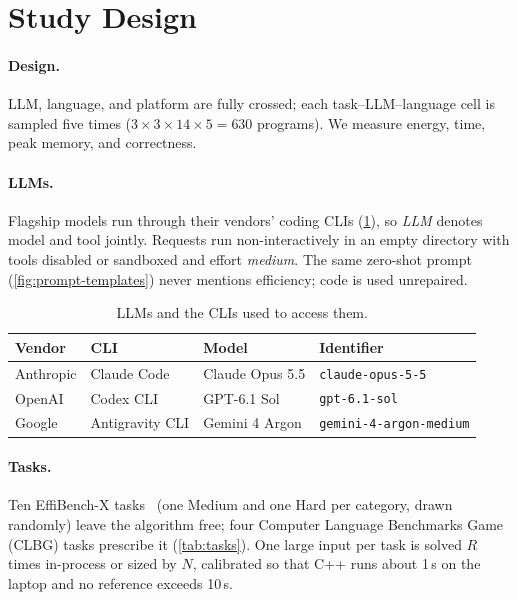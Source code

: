 \section{Study Design}
\label{sec:setup}

\paragraph{Design.}
LLM, language, and platform are fully crossed; each task--LLM--language cell is
sampled five times ($3\times3\times14\times5=630$ programs).
We measure energy, time, peak memory, and correctness.

\paragraph{LLMs.}
Flagship models run through their vendors' coding CLIs (\cref{tab:llms}), so \emph{LLM}
denotes model and tool jointly. Requests run
non-interactively in an empty directory with tools disabled or sandboxed and effort
\emph{medium}. The same zero-shot prompt (\cref{fig:prompt-templates}) never mentions
efficiency; code is used unrepaired.

\begin{table}[t]
  \centering
  \caption{LLMs and the CLIs used to access them.}
  \label{tab:llms}
  \footnotesize
  \setlength{\tabcolsep}{3pt}
  \begin{tabular}{@{}llll@{}}
    \toprule
    Vendor & CLI & Model & Identifier \\
    \midrule
    Anthropic & Claude Code & Claude Opus 5.5        & {\scriptsize\texttt{claude-opus-5-5}} \\
    OpenAI    & Codex CLI & GPT-6.1 Sol            & {\scriptsize\texttt{gpt-6.1-sol}} \\
    Google    & Antigravity CLI & Gemini 4 Argon      & {\scriptsize\texttt{gemini-4-argon-medium}} \\
    \bottomrule
  \end{tabular}
\end{table}

\paragraph{Tasks.}
Ten EffiBench-X tasks~\cite{qing2025effibenchx} (one Medium and one Hard per category,
drawn randomly) leave the algorithm free; four Computer Language Benchmarks Game (CLBG)
tasks prescribe it (\cref{tab:tasks}). One large input per task is solved $R$ times
in-process or sized by $N$, calibrated so that C++ runs about 1\,s on the laptop and no
reference exceeds 10\,s.

